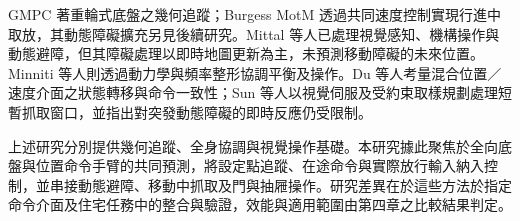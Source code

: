 GMPC 著重輪式底盤之幾何追蹤；Burgess MotM 透過共同速度控制實現行進中取放，其動態障礙擴充另見後續研究\cite{burgess2024reactive}。Mittal 等人已處理視覺感知、機構操作與動態避障，但其障礙處理以即時地圖更新為主，未預測移動障礙的未來位置。Minniti 等人則透過動力學與頻率整形協調平衡及操作。Du 等人考量混合位置／速度介面之狀態轉移與命令一致性；Sun 等人以視覺伺服及受約束取樣規劃處理短暫抓取窗口，並指出對突發動態障礙的即時反應仍受限制。

上述研究分別提供幾何追蹤、全身協調與視覺操作基礎。本研究據此聚焦於全向底盤與位置命令手臂的共同預測，將設定點追蹤、在途命令與實際放行輸入納入控制，並串接動態避障、移動中抓取及門與抽屜操作。研究差異在於這些方法於指定命令介面及住宅任務中的整合與驗證，效能與適用範圍由第四章之比較結果判定。
